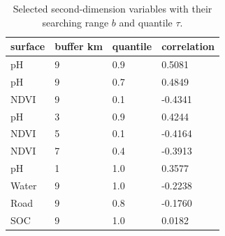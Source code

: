 \begin{table}[t]\centering
\caption{Selected second-dimension variables with their searching range $b$ and quantile $\tau$.}\label{tab:selected}
\begin{tabular}{llll}
\hline
surface & buffer km & quantile & correlation \\
\hline
pH & 9 & 0.9 &  0.5081 \\
pH & 9 & 0.7 &  0.4849 \\
NDVI & 9 & 0.1 & -0.4341 \\
pH & 3 & 0.9 &  0.4244 \\
NDVI & 5 & 0.1 & -0.4164 \\
NDVI & 7 & 0.4 & -0.3913 \\
pH & 1 & 1.0 &  0.3577 \\
Water & 9 & 1.0 & -0.2238 \\
Road & 9 & 0.8 & -0.1760 \\
SOC & 9 & 1.0 &  0.0182 \\
\hline
\end{tabular}\end{table}
